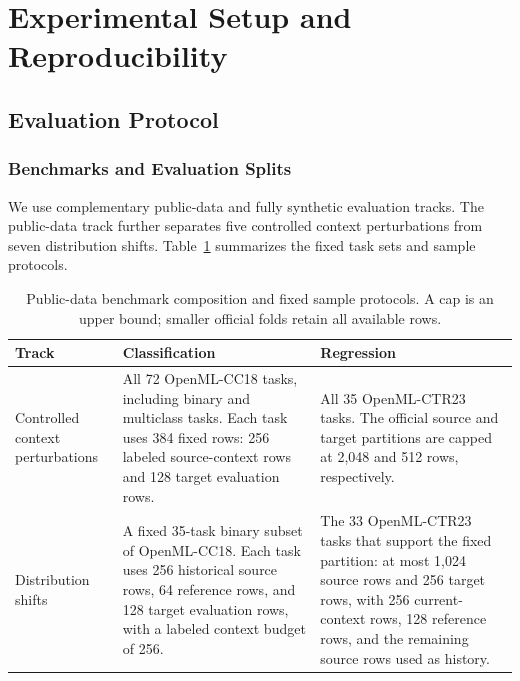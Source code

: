 \section{Experimental Setup and Reproducibility}
\label{app:experimental_setup}
\label{app:experimental_details}

\subsection{Evaluation Protocol}
\label{app:evaluation_protocol}

\subsubsection{Benchmarks and Evaluation Splits}
\label{app:data_splits}

We use complementary public-data and fully synthetic evaluation tracks.  The
public-data track further separates five controlled context perturbations from
seven distribution shifts.  Table~\ref{tab:public-benchmark-protocols}
summarizes the fixed task sets and sample protocols.

\begin{table}[H]
  \caption{Public-data benchmark composition and fixed sample protocols.  A
  cap is an upper bound; smaller official folds retain all available rows.}
  \label{tab:public-benchmark-protocols}
  \centering
  \footnotesize
  \setlength{\tabcolsep}{4pt}
  \begin{tabular}{@{}>{\raggedright\arraybackslash}p{}
                      >{\raggedright\arraybackslash}p{}
                      >{\raggedright\arraybackslash}p{}@{}}
    \toprule
    Track & Classification & Regression \\
    \midrule
    Controlled context perturbations
      & All 72 OpenML-CC18 tasks, including binary and multiclass tasks.  Each
        task uses 384 fixed rows: 256 labeled source-context rows and 128 target
        evaluation rows.
      & All 35 OpenML-CTR23 tasks.  The official source and target partitions
        are capped at 2,048 and 512 rows, respectively. \\
    Distribution shifts
      & A fixed 35-task binary subset of OpenML-CC18.  Each task uses 256
        historical source rows, 64 reference rows, and 128 target evaluation
        rows, with a labeled context budget of 256.
      & The 33 OpenML-CTR23 tasks that support the fixed partition: at most
        1,024 source rows and 256 target rows, with 256 current-context rows,
        128 reference rows, and the remaining source rows used as history. \\
    \bottomrule
  \end{tabular}
\end{table}


